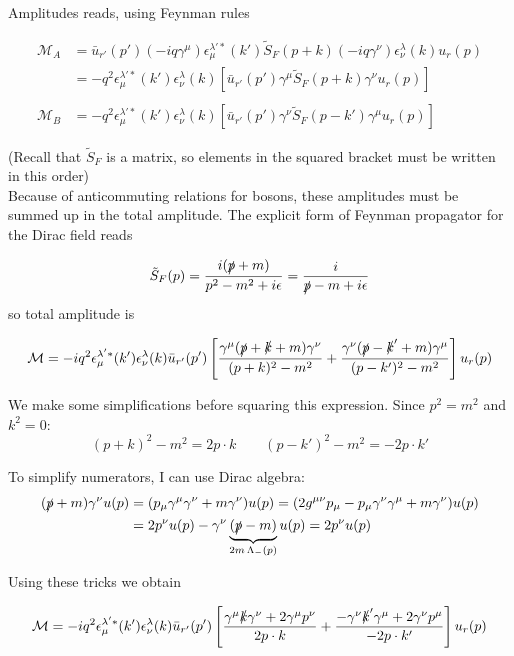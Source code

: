 \documentclass[TheoreticalPhy_ModB.tex]{subfiles}
\begin{document}
\skipline
Amplitudes reads, using Feynman rules

\begin{align*}
\mathcal M_A&=\bar u_{r'}(p')(-iq\gamma^\mu)\epsilon_\mu^{\lambda'*}(k')\tilde S_F(p+k)(-iq\gamma^\nu)\epsilon_\nu^\lambda(k)u_r(p)\\
&=-q^2\epsilon_\mu^{\lambda'*}(k')\epsilon_\nu^\lambda(k)\left[\bar u_{r'}(p')\gamma^\mu\tilde S_F(p+k)\gamma^\nu u_r(p)\right]\\
&\,\\
\mathcal M_B&=-q^2\epsilon_\mu^{\lambda'*}(k')\epsilon_\nu^\lambda(k)\left[\bar u_{r'}(p')\gamma^\nu\tilde S_F(p-k')\gamma^\mu u_r(p)\right]
\end{align*}

{\small (Recall that $\tilde S_F$ is a matrix, so elements in the squared bracket  must be written in this order)}\\
Because of anticommuting relations for bosons, these amplitudes must be summed up in the total amplitude.
The explicit form of Feynman propagator for the Dirac field reads

\[\tilde S_F(p)=\frac{i(\slashed p+m)}{p^2-m^2+i\epsilon}=\frac i{\slashed p-m+i\epsilon}\]
so total amplitude is

\[\mathcal M=-iq^2\epsilon_\mu^{\lambda'*}(k')\epsilon_\nu^\lambda(k)\bar u_{r'}(p')\left[\frac{\gamma^\mu(\slashed p+\slashed k+m)\gamma^\nu}{(p+k)^2-m^2}+\frac{\gamma^\nu(\slashed p-\slashed k'+m)\gamma^\mu}{(p-k')^2-m^2}\right]u_r(p)\]

We make some simplifications before squaring  this expression. Since $p^2=m^2$ and $k^2=0$:
\[(p+k)^2-m^2=2p\cdot k\qquad(p-k')^2-m^2=-2p\cdot k'\]

To simplify numerators, I can use Dirac algebra:
\begin{align*} 
(\slashed p+m)\gamma^\nu u(p)&=(p_\mu\gamma^\mu\gamma^\nu+m\gamma^\nu)u(p)=(2g^{\mu\nu}p_\mu-p_\mu\gamma^\nu\gamma^\mu+m\gamma^\nu)u(p)\\
&=2p^\nu u(p)-\gamma^\nu\underbrace{(\slashed p-m)}_{2m\,\Lambda_-(p)}u(p)=2p^\nu u(p)
\end{align*}

Using these tricks we obtain

\[\mathcal M = -iq^2\epsilon_\mu^{\lambda'*}(k')\epsilon_\nu^\lambda(k)\bar u_{r'}(p')\left[\frac{\gamma^\mu\slashed k\gamma^\nu+2\gamma^\mu p^\nu}{2p\cdot k}+\frac{-\gamma^\nu\slashed k'\gamma^\mu+2\gamma^\nu p^\mu}{-2p\cdot k'}\right]u_r(p)\]
\end{document}
